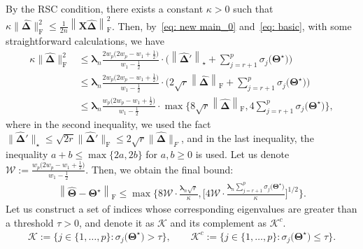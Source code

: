 \documentclass[alpha-refs]{wiley-article}
\begin{document}
By the RSC condition, there exists a constant $\kappa>0$ such that $\kappa \|\boldsymbol{\widehat{\Delta}}\|_{\text{F}}^{2}\leq \frac{1}{2n} \left\| \boldsymbol{X} \boldsymbol{\widehat{\Delta}} \right\|_{\text{F}}^{2}$.
Then, by~\eqref{eq: new main_0} and~\eqref{eq: basic}, with some straightforward calculations, we have
\begin{align} 
    \kappa \|\boldsymbol{\widehat{\Delta}}\|_{\text{F}}^{2}
    &\leq  
    \boldsymbol{\lambda}_{n}\frac{2w_{p}\big(2w_{p}-w_{1}+\frac{1}{2}\big)}{w_{1}-\frac{1}{2}}
    \cdot \bigg( \left\| \boldsymbol{\widehat{\Delta}}' \right\|_{\star} + \sum_{j=r+1}^{p}\sigma_{j}\big(\boldsymbol{\Theta^{\star}}\big) \bigg) \nonumber \\
    &\leq 
    \boldsymbol{\lambda}_{n}\frac{2w_{p}\big(2w_{p}-w_{1}+\frac{1}{2}\big)}{w_{1}-\frac{1}{2}}
    \cdot \bigg( 2\sqrt{r} \left\| \boldsymbol{\widehat{\Delta}} \right\|_{\text{F}} + \sum_{j=r+1}^{p}\sigma_{j}\big(\boldsymbol{\Theta^{\star}}\big) \bigg) \nonumber \\
    &\leq 
    \boldsymbol{\lambda}_{n} \frac{w_{p}\big(2w_{p}-w_{1}+\frac{1}{2}\big)}{w_{1}-\frac{1}{2}}
    \cdot \max \bigg\{ 8 \sqrt{r} \left\| \boldsymbol{\widehat{\Delta}} \right\|_{\text{F}}, 4\sum_{j=r+1}^{p}\sigma_{j}\big(\boldsymbol{\Theta^{\star}}\big) 
    \bigg\} \nonumber,
\end{align}
where in the second inequality, we used the fact 
$\|\boldsymbol{\widehat{\Delta}}'\|_{\star}\leq\sqrt{2r}\|\boldsymbol{\widehat{\Delta}}'\|_{\text{F}} \leq 2\sqrt{r}\|\boldsymbol{\widehat{\Delta}}\|_{F}$, and in the last inequality, 
the inequality $a+b\leq \max\{2a, 2b\}$ for $a,b\geq 0$ is used.
Let us denote $\mathcal{W}:=\frac{w_{p}\big(2w_{p}-w_{1}+\frac{1}{2}\big)}{w_{1}-\frac{1}{2}}$.
Then, we obtain the final bound:
\begin{align} \label{Est_bound}
    \left\| \widehat{\boldsymbol{\Theta}} - \boldsymbol{\Theta^{\star}} \right\|_{\text{F}}
    \leq \max\bigg\{ 8\mathcal{W} \cdot \frac{\boldsymbol{\lambda}_{n}\sqrt{r}}{\kappa}, 
    \bigg[  4 \mathcal{W} \cdot \frac{\boldsymbol{\lambda}_{n}\sum_{j=r+1}^{p}\sigma_{j}\big(\boldsymbol{\Theta^{\star}}\big)}{\kappa}  \bigg]^{1/2}
    \bigg\}.
\end{align}
Let us construct a set of indices whose corresponding eigenvalues are greater than a threshold $\tau>0$, and denote it as $\mathcal{K}$ and its complement as $\mathcal{K}^{c}$.
\begin{align*}
    \mathcal{K}:=\bigg\{ j \in \{1,\dots,p\} : \sigma_{j}\big(\boldsymbol{\Theta}^{\star} \big) > \tau \bigg\}, \qquad 
    \mathcal{K}^{c}:=\bigg\{ j \in \{1,\dots,p\} : \sigma_{j}\big(\boldsymbol{\Theta}^{\star} \big) \leq \tau \bigg\}.
\end{align*}
\end{document}
